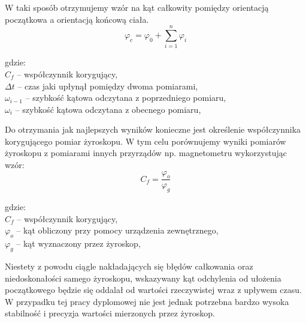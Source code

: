 W taki sposób otrzymujemy wzór na kąt całkowity pomiędzy orientacją początkowa a orientacją końcową ciała.
\begin{equation}
  \varphi_{c} = \varphi_{0} + \sum_{i=1}^{n} \varphi_{i} 
\end{equation}
\begin{tabbing}
  gdzie: \= \\
    \> $C_{f}$ -- współczynnik korygujący, \\
    \> $\Delta t$ -- czas jaki upłynął pomiędzy dwoma pomiarami,\\
    \> $\omega_{i-1}$ -- szybkość kątowa odczytana z poprzedniego pomiaru,\\
    \> $\omega_{i}$ -- szybkość kątowa odczytana z obecnego pomiaru,\\
\end{tabbing}

Do otrzymania jak najlepszych wyników konieczne jest określenie współczynnika korygującego pomiar żyroskopu.
W tym celu porównujemy wyniki pomiarów żyroskopu z pomiarami innych przyrządów np. magnetometru wykorzystując wzór:
\begin{equation}
  C_{f} = \frac{\varphi_{o}}{\varphi_{g}}
\end{equation}
\begin{tabbing}
  gdzie: \= \\
    \> $C_{f}$ -- współczynnik korygujący, \\
    \> $\varphi_{o}$ -- kąt obliczony przy pomocy urządzenia zewnętrznego,\\
    \> $\varphi_{g}$ -- kąt wyznaczony przez żyroskop,\\
\end{tabbing}

Niestety z powodu ciągle nakładających się błędów całkowania oraz niedoskonałości samego żyroskopu, wskazywany kąt odchylenia od ułożenia początkowego będzie się oddalał od wartości rzeczywistej wraz z upływem czasu. W przypadku tej pracy dyplomowej nie jest jednak potrzebna bardzo wysoka stabilność i precyzja wartości mierzonych przez żyroskop.

